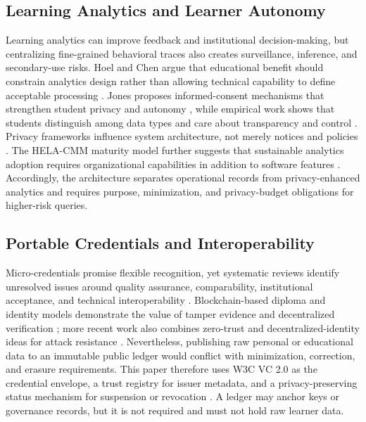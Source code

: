 \documentclass[journal]{IEEEtran}
\begin{document}
\subsection{Learning Analytics and Learner Autonomy}
Learning analytics can improve feedback and institutional decision-making, but centralizing fine-grained behavioral traces also creates surveillance, inference, and secondary-use risks. Hoel and Chen argue that educational benefit should constrain analytics design rather than allowing technical capability to define acceptable processing \cite{hoelchen2018}. Jones proposes informed-consent mechanisms that strengthen student privacy and autonomy \cite{jones2019}, while empirical work shows that students distinguish among data types and care about transparency and control \cite{ifenthaler2016}. Privacy frameworks influence system architecture, not merely notices and policies \cite{hoelgriffiths2017,hoelchen2019}. The HELA-CMM maturity model further suggests that sustainable analytics adoption requires organizational capabilities in addition to software features \cite{simic2025}. Accordingly, the architecture separates operational records from privacy-enhanced analytics and requires purpose, minimization, and privacy-budget obligations for higher-risk queries.

\subsection{Portable Credentials and Interoperability}
Micro-credentials promise flexible recognition, yet systematic reviews identify unresolved issues around quality assurance, comparability, institutional acceptance, and technical interoperability \cite{ahsan2023,varadarajan2023}. Blockchain-based diploma and identity models demonstrate the value of tamper evidence and decentralized verification \cite{rustemi2024,wang2025}; more recent work also combines zero-trust and decentralized-identity ideas for attack resistance \cite{emati2026}. Nevertheless, publishing raw personal or educational data to an immutable public ledger would conflict with minimization, correction, and erasure requirements. This paper therefore uses W3C VC 2.0 as the credential envelope, a trust registry for issuer metadata, and a privacy-preserving status mechanism for suspension or revocation \cite{w3cvc20,w3cstatus}. A ledger may anchor keys or governance records, but it is not required and must not hold raw learner data.
\end{document}
